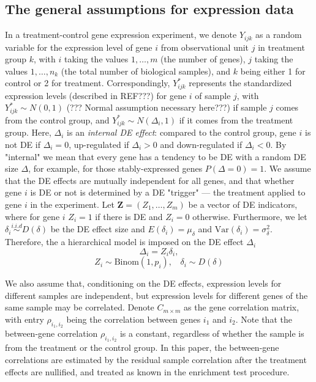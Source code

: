 \documentclass[11pt, a4paper]{article}
\begin{document}
\subsection{The general assumptions for expression data}
In a treatment-control gene expression experiment, we denote $Y_{ijk}$ as a random variable for the expression level of gene $i$ from observational unit $j$ in treatment group $k$, with $i$ taking the values $1, \ldots, m$ (the number of genes), $j$ taking the values $1, \ldots, n_k$ (the total number of biological samples), and $k$ being either 1 for control or 2 for treatment. Correspondingly, $Y^{\ast}_{ijk}$ represents the standardized expression levels (described in REF???) for gene $i$ of sample $j$, with $Y^{\ast}_{ijk}\sim N(0, 1)$ (??? Normal assumption necessary here???)  if sample $j$ comes from the control group, and $Y^{\ast}_{ijk}\sim N(\Delta_i, 1)$ if it comes from the treatment group. 
Here, $\Delta_i$ is an \textit{internal DE effect}: compared to the control group,  gene $i$ is not DE if $\Delta_i=0$, up-regulated if $\Delta_i >0 $ and down-regulated if $\Delta_i<0$. By "internal" we mean that every gene has a tendency to be DE with a random DE size $\Delta$, for example, for those stably-expressed genes $P(\Delta = 0) = 1$.  We assume that the DE effects are mutually independent for all genes, and that whether gene $i$ is DE or not is determined by a DE "trigger" --- the treatment applied to gene $i$ in the experiment. Let $\bm Z = (Z_1, \ldots, Z_m)$ be a vector of DE indicators, where for gene $i$ $Z_i=1$ if there is DE and $Z_i = 0$ otherwise. Furthermore, we let $\delta_i \stackrel{i.i.d}{\sim} D(\delta)$ be the DE effect size and $E(\delta_i) = \mu_{\delta}$ and $\text{Var}(\delta_i) = \sigma^2_{\delta}$. Therefore, the a hierarchical model is imposed on the DE effect $\Delta_i$
\begin{equation}\label{eq:DEeffect}
 \Delta_i = Z_i\delta_i,
\end{equation}
\begin{equation}\label{eq:DEindicator}
Z_i \sim \text{Binom}(1, p_i), ~~~~\delta_i \sim D(\delta)
\end{equation}




We also assume that, conditioning on the DE effects, expression levels for different samples are independent, but expression levels for different genes of the same sample may be correlated. Denote $C_{m \times m}$ as the gene correlation matrix, with entry $\rho_{i_1, i_2}$ being the correlation between genes $i_1$ and $i_2$. Note that the between-gene correlation $\rho_{i_1, i_2}$ is a constant, regardless of whether the sample is from the treatment or the control group. In this paper, the between-gene correlations are estimated by the residual sample correlation after the treatment effects are nullified, and treated as known in the enrichment test procedure.
\end{document}
